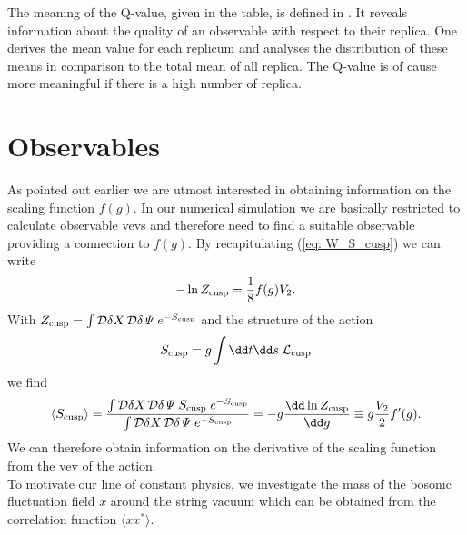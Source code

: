 %
%
%

%
%
%
The meaning of the Q-value, given in the table, is defined in \cite{Wolff:2003sm}. It reveals information about the quality of an observable with respect to their replica. One derives the mean value for each replicum and analyses the distribution of these means in comparison to the total mean of all replica. The Q-value is of cause more meaningful if there is a high number of replica. 
%
%
%
%
%
%
%
%
%
%
%
\section{Observables}
As pointed out earlier we are utmost interested in obtaining information on the scaling function $f(g)$. In our numerical simulation we are basically restricted to calculate observable vevs and therefore need to find a suitable observable providing a connection to $f(g)$. By recapitulating (\ref{eq: W_S_cusp}) we can write
%
%
\begin{equation}
-\ln Z_{\rm cusp} = \frac{1}{8} f(g)V_{2}.
\end{equation}
%
%
With $Z_{\rm cusp} = \int \mathcal{D}\delta X\,\mathcal{D}\delta \mathit{\Psi}\;e^{-S_{\rm cusp}}$ and the structure of the action 
\begin{equation}
S_{\rm cusp} = g \int \dd t \dd s \; \mathcal{L}_{\rm cusp}
\end{equation}
we find
%
%
\begin{equation}
\langle S_{\rm cusp} \rangle = \frac{\int \mathcal{D}\delta X\,\mathcal{D}\delta\mathit{\Psi} \; S_{\rm cusp} \;e^{-S_{\rm cusp}}}{\int \mathcal{D}\delta X\,\mathcal{D}\delta\mathit{\Psi} \; e^{-S_{\rm cusp}}} = -g \frac{\dd \ln Z_{\rm cusp}}{\dd g} \equiv g\frac{V_{2}}{2} f'(g).
\label{eq: <S_cusp>}
\end{equation}
%
%
We can therefore obtain information on the derivative of the scaling function from the vev of the action.\\
To motivate our line of constant physics, we investigate the mass of the bosonic fluctuation field $x$ around the string vacuum which can be obtained from the correlation function $\langle x x^{*}\rangle$.
%
%
%
%
%
%
%
% 
